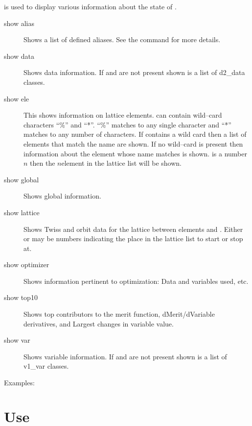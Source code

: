 \vskip 0.2in
 is used to display various information about the state of \tao.
\begin{description}
\item[show alias]
Shows a list of defined aliases. See the  command for more details.
\item[show data]
Shows data information. If  and  are not present shown 
is a list of d2\_data classes.
\item[show ele]
This shows information on lattice elements.  can contain wild--card
characters ``\%'' and ``*''. ``\%'' matches to any single character and
``*'' matches to any number of characters. If  contains a
wild card then a list of elements that match the name are shown. If no wild--card
is present then information about the element whose name matches 
is shown.  is a number $n$ then the $n$\Th element in the lattice 
list will be shown.
\item[show global]
Shows global information.
\item[show lattice]
Shows Twiss and orbit data for the  lattice between elements
 and . Either  or
 may be numbers indicating the place in the lattice
list to start or stop at.
\item[show optimizer]
Shows information pertinent to optimization: Data and variables used, etc.
\item[show top10]
Shows top contributors to the merit function, dMerit/dVariable
derivatives, and Largest changes in variable value.
\item[show var]
Shows variable information. If  and  are not present shown 
is a list of v1\_var classes.
\end{description}

Examples:

\section{Use}
\label{s:use}

